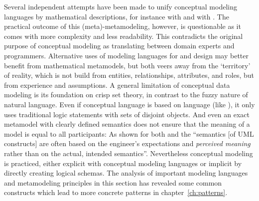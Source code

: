 Several independent attempts have been made to unify conceptual modeling
languages by mathematical descriptions, for instance with  \textcite{Frederiks1997} and with 
\cite{Keet2008b}. The practical outcome of this (meta)-metamodeling, however,
is questionable as it comes with more complexity and less readability.  This
contradicts the original purpose of conceptual modeling as translating between
domain experts and programmers. Alternative uses of modeling languages for
 and  design may better benefit
from mathematical metamodels, but both veers away from the `territory' of
reality, which is not build from entities, relationships, attributes, and
roles, but from experience and assumptions.  A general limitation of conceptual
data modeling is its foundation on crisp set theory, in contrast to the fuzzy
nature of natural language. Even if conceptual language is based on language
(like ), it only uses traditional logic statements with sets of
disjoint objects. And even an exact metamodel with clearly defined semantics
does not ensure that the meaning of a model is equal to all participants: As
shown for both  \textcite{Hitchman1995} and 
\cite{Oliver2006} the ``semantics [of UML constructs] are often based on the
engineer’s expectations and {\em perceived meaning} rather than on the actual,
intended semantics''.  Nevertheless conceptual modeling is practiced, either
explicit with conceptual modeling languages or implicit by directly creating
logical schemas. The analysis of important modeling languages and metamodeling
principles in this section has revealed some common constructs which lead to
more concrete patterns in chapter~\ref{ch:patterns}.


